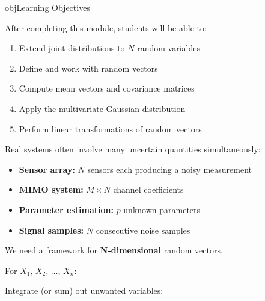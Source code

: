 \begin{PSbox}[unbreakable]{obj}{Learning Objectives}

After completing this module, students will be able to:

\begin{enumerate}
\def\labelenumi{\arabic{enumi}.}
\tightlist
\item
  Extend joint distributions to $N$ random variables
\item
  Define and work with random vectors
\item
  Compute mean vectors and covariance matrices
\item
  Apply the multivariate Gaussian distribution
\item
  Perform linear transformations of random vectors
\end{enumerate}

\end{PSbox}


Real systems often involve many uncertain quantities simultaneously:

\begin{itemize}
\tightlist
\item
  \textbf{Sensor array:} $N$ sensors each producing a noisy measurement
\item
  \textbf{MIMO system:} $M \times N$ channel coefficients
\item
  \textbf{Parameter estimation:} $p$ unknown parameters
\item
  \textbf{Signal samples:} $N$ consecutive noise samples
\end{itemize}

We need a framework for \textbf{N-dimensional} random vectors.



For $X_{1},\, X_{2},\, \ldots,\, X_{n}$:


Integrate (or sum) out unwanted variables:



